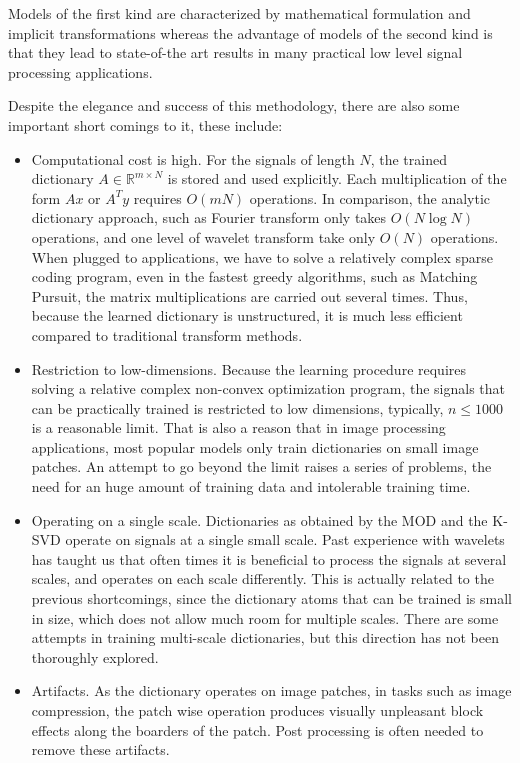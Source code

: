 \documentclass[a4paper]{article}
\begin{document}
Models of the first kind are characterized by mathematical formulation and implicit transformations whereas the advantage of models of the second kind is that they lead to state-of-the art results in many practical low level signal processing applications. 

Despite the elegance and success of this methodology, there are also some important short comings to it, these include:
\begin{itemize}
	\item Computational cost is high. For the signals of length $N$, the trained dictionary $A\in \mathbb{R}^{m\times N}$ is stored and used explicitly. Each multiplication of the form $Ax$ or $A^Ty$ requires $O(mN)$ operations. In comparison, the analytic dictionary approach, such as Fourier transform only takes $O(N\log N)$ operations, and one level of wavelet transform take only $O(N)$ operations. When plugged to applications, we have to solve a relatively complex sparse coding program, even in the fastest greedy algorithms, such as Matching Pursuit, the matrix multiplications are carried out several times. Thus, because the learned dictionary is unstructured, it is much less efficient compared to traditional transform methods.
	\item Restriction to low-dimensions. Because the learning procedure requires solving a relative complex non-convex optimization program, the signals that can be practically trained is restricted to low dimensions, typically, $n\leq 1000$ is a reasonable limit. That is also a reason that in image processing applications, most popular models only train dictionaries on small image patches. An attempt to go beyond the limit raises a series of problems, the need for an huge amount of training data and intolerable training time.
	\item Operating on a single scale. Dictionaries as obtained by the MOD and the K-SVD operate on signals at a single small scale. Past experience with wavelets has taught us that often times it is beneficial to process the signals at several scales, and operates on each scale differently. This is actually related to the previous shortcomings, since the dictionary atoms that can be trained is small in size, which does not allow much room for multiple scales. There are some attempts in training multi-scale dictionaries, but this direction has not been thoroughly explored.
	\item Artifacts. As the dictionary operates on image patches, in tasks such as image compression, the patch wise operation produces visually unpleasant block effects along the boarders of the patch. Post processing is often needed to remove these artifacts. 
\end{itemize}
\end{document}
